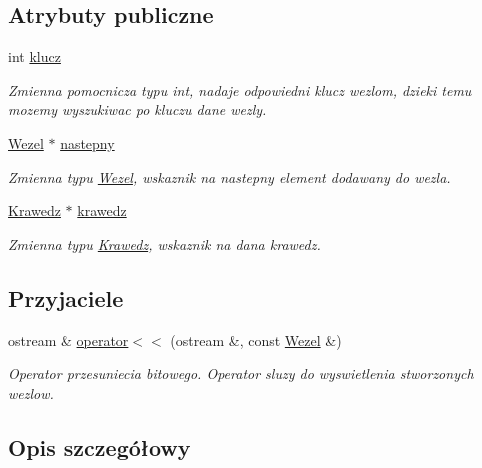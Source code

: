 \subsection*{\-Atrybuty publiczne}
\begin{DoxyCompactItemize}
\item 
int \hyperlink{class_graf_1_1_wezel_a3ec9c69e3f5ad7de599064420a252d0c}{klucz}
\begin{DoxyCompactList}\small\item\em \-Zmienna pomocnicza typu int, nadaje odpowiedni klucz wezlom, dzieki temu mozemy wyszukiwac po kluczu dane wezly. \end{DoxyCompactList}\item 
\hyperlink{class_graf_1_1_wezel}{\-Wezel} $\ast$ \hyperlink{class_graf_1_1_wezel_a81da02b086fccaf3d497b0eb13376c38}{nastepny}
\begin{DoxyCompactList}\small\item\em \-Zmienna typu \hyperlink{class_graf_1_1_wezel}{\-Wezel}, wskaznik na nastepny element dodawany do wezla. \end{DoxyCompactList}\item 
\hyperlink{class_graf_1_1_wezel_1_1_krawedz}{\-Krawedz} $\ast$ \hyperlink{class_graf_1_1_wezel_afad1099bb7f0eb0fbc5ca6482f3e1bde}{krawedz}
\begin{DoxyCompactList}\small\item\em \-Zmienna typu \hyperlink{class_graf_1_1_wezel_1_1_krawedz}{\-Krawedz}, wskaznik na dana krawedz. \end{DoxyCompactList}\end{DoxyCompactItemize}
\subsection*{\-Przyjaciele}
\begin{DoxyCompactItemize}
\item 
ostream \& \hyperlink{class_graf_1_1_wezel_a9201be58f6a5b637792928252f3dc8e2}{operator$<$$<$} (ostream \&, const \hyperlink{class_graf_1_1_wezel}{\-Wezel} \&)
\begin{DoxyCompactList}\small\item\em \-Operator przesuniecia bitowego. \-Operator sluzy do wyswietlenia stworzonych wezlow. \end{DoxyCompactList}\end{DoxyCompactItemize}


\subsection{\-Opis szczegółowy}


